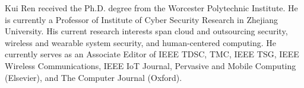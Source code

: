 \begin{IEEEbiography}{Kui Ren} received the Ph.D. degree from the Worcester Polytechnic Institute. He is currently a Professor of Institute of Cyber Security Research in Zhejiang University. His current research interests span cloud and outsourcing security, wireless and wearable system security, and human-centered computing. He currently serves as an Associate Editor of IEEE TDSC, TMC, IEEE TSG, IEEE Wireless Communications, IEEE IoT Journal, Pervasive and Mobile Computing (Elsevier), and The Computer Journal (Oxford).


\end{IEEEbiography}

